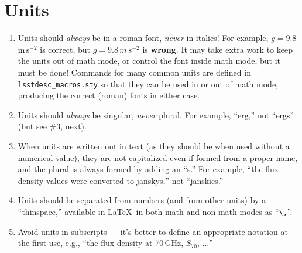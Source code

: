 \documentclass[letterpaper,11pt]{article}
\begin{document}
\section{Units}

\begin{enumerate}

\item Units should {\it always\/} be in a roman font, {\it never\/} in
italics!  For example, $g = 9.8$\,m\,s$^{-2}$ is correct,
but $g=9.8\,m\,s^{-2}$ is
{\bf wrong}.  It may take extra work to keep the units out of math mode, or
control the font inside math mode, but it must be done!  Commands for many
common units are defined in {\tt lsstdesc\_macros.sty} so that they can be used in or out of
math mode, producing the correct (roman) fonts in either case.

\item Units should {\it always\/} be singular, {\it never\/} plural.  For
example, ``erg,'' not ``ergs'' (but see \#3, next).

\item When units are written out in text (as they should be when used without
a numerical value), they are not capitalized even if formed from a proper name,
and the plural is always formed by adding an ``s.''  For example, ``the flux
density values were converted to janskys,''  not ``janskies.''



\item Units should be separated from numbers (and from other units) by a
``thinspace,'' available in La\TeX\ in both math and non-math modes as
``\verb|\,|''.

\item Avoid units in subscripts --- it's better to define an appropriate
notation at the first use, e.g., ``the flux density at 70\,GHz,
$S_{70}$, $\ldots$''


\end{enumerate}
\end{document}
